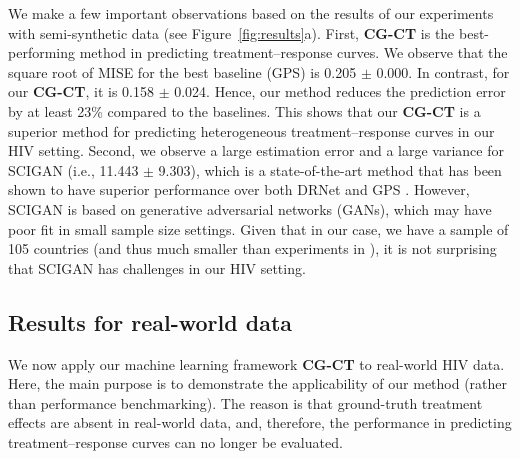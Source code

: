 \documentclass[sigconf]{acmart}
\newcommand{\framework}{\textbf{\mbox{CG-CT}}\xspace}
\begin{document}
We make a few important observations based on the results of our experiments with semi-synthetic data (see Figure~\ref{fig:results}a). First, \framework is the best-performing method in predicting treatment--response curves. We observe that the square root of MISE for the best baseline (GPS) is 0.205 $\pm$ 0.000. In contrast, for our \framework, it is 0.158 $\pm$ 0.024. Hence, our method reduces the prediction error by at least 23\% compared to the baselines. This shows that our \framework is a superior method for predicting heterogeneous treatment--response curves in our HIV setting. Second, we observe a large estimation error and a large variance for SCIGAN (i.e., 11.443 $\pm$ 9.303), which is a state-of-the-art method that has been shown to have superior performance over both DRNet and GPS \cite{Bica2020}. However, SCIGAN is based on generative adversarial networks (GANs), which may have poor fit in small sample size settings. Given that in our case, we have a sample of 105 countries (and thus much smaller than experiments in \cite{Bica2020}), it is not surprising that SCIGAN has challenges in our HIV setting. 


\subsection{Results for real-world data }


We now apply our machine learning framework \framework to real-world HIV data. Here, the main purpose is to demonstrate the applicability of our method (rather than performance benchmarking). The reason is that ground-truth treatment effects are absent in real-world data, and, therefore, the performance in predicting treatment--response curves can no longer be evaluated. %
\end{document}
